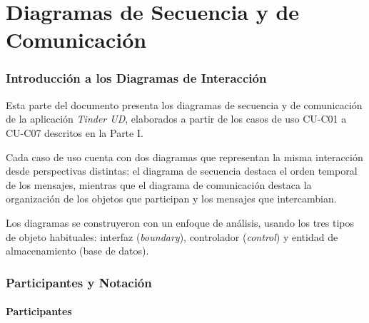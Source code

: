 \documentclass[11pt,a4paper]{article}
\begin{document}
\newpage


\part{Diagramas de Secuencia y de Comunicación}


\section{Introducción a los Diagramas de Interacción}

Esta parte del documento presenta los diagramas de secuencia y de comunicación de
la aplicación \textit{Tinder UD}, elaborados a partir de los casos de uso
CU-C01 a CU-C07 descritos en la Parte I.

Cada caso de uso cuenta con dos diagramas que representan la misma interacción
desde perspectivas distintas: el diagrama de secuencia destaca el orden temporal
de los mensajes, mientras que el diagrama de comunicación destaca la
organización de los objetos que participan y los mensajes que intercambian.

Los diagramas se construyeron con un enfoque de análisis, usando los tres tipos
de objeto habituales: interfaz (\textit{boundary}), controlador
(\textit{control}) y entidad de almacenamiento (base de datos).


\section{Participantes y Notación}

\subsection{Participantes}
\end{document}
